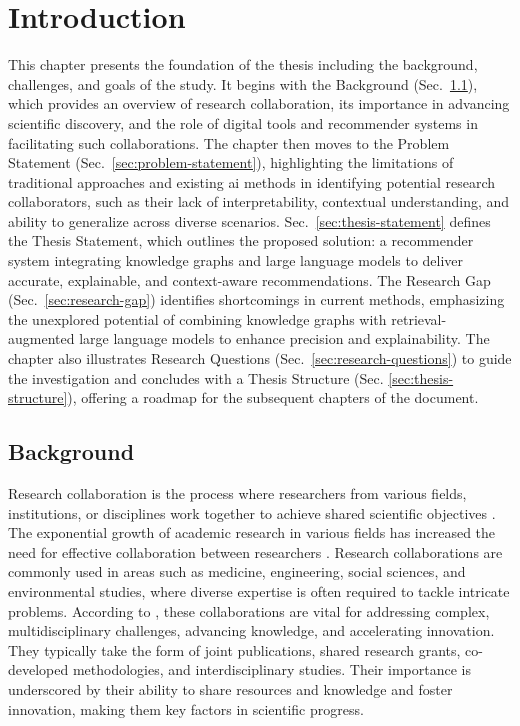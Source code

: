 \chapter{Introduction}\label{chap:intro}

This chapter presents the foundation of the thesis including the background, challenges, and goals of the study.
It begins with the Background (Sec.~\ref{sec:background}), which provides an overview of research collaboration, its importance in advancing scientific discovery, and the role of digital tools and recommender systems in facilitating such collaborations.
The chapter then moves to the Problem Statement (Sec.~\ref{sec:problem-statement}), highlighting the limitations of traditional approaches and existing \gls{ai} methods in identifying potential research collaborators, such as their lack of interpretability, contextual understanding, and ability to generalize across diverse scenarios.
Sec.~\ref{sec:thesis-statement} defines the Thesis Statement, which outlines the proposed solution: a recommender system integrating knowledge graphs and large language models to deliver accurate, explainable, and context-aware recommendations.
The Research Gap (Sec.~\ref{sec:research-gap}) identifies shortcomings in current methods, emphasizing the unexplored potential of combining knowledge graphs with retrieval-augmented large language models to enhance precision and explainability.
The chapter also illustrates Research Questions (Sec.~\ref{sec:research-questions}) to guide the investigation and concludes with a Thesis Structure (Sec. \ref{sec:thesis-structure}), offering a roadmap for the subsequent chapters of the document.

\section{Background}\label{sec:background}
Research collaboration is the process where researchers from various fields, institutions, or disciplines work together to achieve shared scientific objectives \cite{KATZ19971}.
The exponential growth of academic research in various fields has increased the need for effective collaboration between researchers \cite{Adams2012, Vermeulen2017}.
Research collaborations are commonly used in areas such as medicine, engineering, social sciences, and environmental studies, where diverse expertise is often required to tackle intricate problems.
According to \textcite{Mei2021}, these collaborations are vital for addressing complex, multidisciplinary challenges, advancing knowledge, and accelerating innovation.
They typically take the form of joint publications, shared research grants, co-developed methodologies, and interdisciplinary studies.
Their importance is underscored by their ability to share resources and knowledge and foster innovation, making them key factors in scientific progress.

